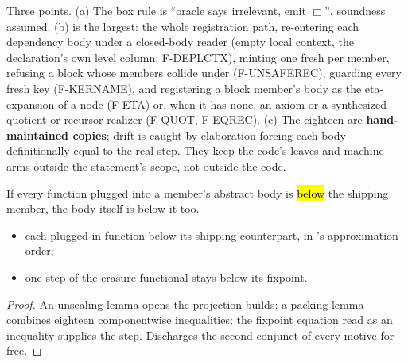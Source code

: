 \begin{remark}
Three points.  (a) The box rule is ``oracle says irrelevant, emit $\Box$'', soundness
assumed. (b)  is the largest: the whole registration path, re-entering each dependency
body under a closed-body reader (empty local context, the declaration's own level column; F-DEPLCTX),
minting one fresh  per member, refusing a block whose members collide under 
(F-UNSAFEREC), guarding every fresh key (F-KERNAME), and registering a block member's body as the
eta-expansion of a  node (F-ETA) or, when it has none, an axiom or a synthesized quotient
or recursor realizer (F-QUOT, F-EQREC). (c) The eighteen are
\textbf{hand-maintained copies}; drift is caught by elaboration forcing each body definitionally equal to
the real step. They keep the code's  leaves and machine- arms outside the
statement's scope, not outside the code.
\end{remark}

\begin{lemma}
\label{lem:bodyLe1}
\leanok
{}
 If every function plugged into a member's abstract body is \hl{below} the shipping
member, the body itself is below it too.
\begin{itemize}
\item {} each plugged-in function below its shipping counterpart, in 's
approximation order;
\item {} one step of the erasure functional stays below its fixpoint.
\end{itemize}
\end{lemma}
\begin{proof}
\leanok
{}
 An unsealing lemma opens the  projection 
builds; a packing lemma combines eighteen componentwise inequalities; the fixpoint equation read as an
inequality supplies the step. Discharges the second conjunct of every motive for free.
\end{proof}

